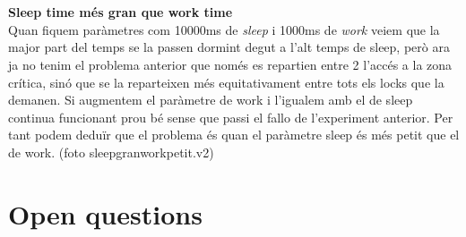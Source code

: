 \documentclass[a4paper, 10pt]{article}
\begin{document}
\begin{itemize}
\\
\\
\textbf{Sleep time més gran que work time}\\
Quan fiquem paràmetres com 10000ms de \textit{sleep} i 1000ms de \textit{work} veiem que la major part del temps se la passen dormint degut a l'alt temps de sleep, però ara ja no tenim el problema anterior que només es repartien entre 2 l'accés a la zona crítica, sinó que se la reparteixen més equitativament entre tots els locks que la demanen. Si augmentem el paràmetre de work i l'igualem amb el de sleep continua funcionant prou bé sense que passi el fallo de l'experiment anterior. Per tant podem deduïr que el problema és quan el paràmetre sleep és més petit que el de work. (foto sleepgranworkpetit.v2)



\end{itemize}

\begin{itemize}


\end{itemize}

\newpage

\section{Open questions}
\end{document}
